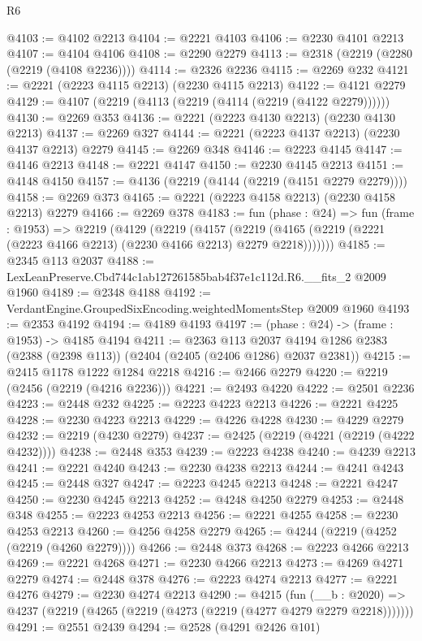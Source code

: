 \begin{lexlean}{R6}
\begin{coremodule}
@4103 := @4102 @2213
@4104 := @2221 @4103
@4106 := @2230 @4101 @2213
@4107 := @4104 @4106
@4108 := @2290 @2279
@4113 := @2318 (@2219 (@2280 (@2219 (@4108 @2236))))
@4114 := @2326 @2236
@4115 := @2269 @232
@4121 := @2221 (@2223 @4115 @2213) (@2230 @4115 @2213)
@4122 := @4121 @2279
@4129 := @4107 (@2219 (@4113 (@2219 (@4114 (@2219 (@4122 @2279))))))
@4130 := @2269 @353
@4136 := @2221 (@2223 @4130 @2213) (@2230 @4130 @2213)
@4137 := @2269 @327
@4144 := @2221 (@2223 @4137 @2213) (@2230 @4137 @2213) @2279
@4145 := @2269 @348
@4146 := @2223 @4145
@4147 := @4146 @2213
@4148 := @2221 @4147
@4150 := @2230 @4145 @2213
@4151 := @4148 @4150
@4157 := @4136 (@2219 (@4144 (@2219 (@4151 @2279 @2279))))
@4158 := @2269 @373
@4165 := @2221 (@2223 @4158 @2213) (@2230 @4158 @2213) @2279
@4166 := @2269 @378
@4183 := fun (phase : @24) =>
  fun (frame : @1953) =>
  @2219
    (@4129
      (@2219
        (@4157
          (@2219 (@4165 (@2219 (@2221 (@2223 @4166 @2213) (@2230 @4166 @2213) @2279 @2218)))))))
@4185 := @2345 @113 @2037
@4188 := LexLeanPreserve.Cbd744c1ab127261585bab4f37e1c112d.R6.__fits_2 @2009 @1960
@4189 := @2348 @4188
@4192 := VerdantEngine.GroupedSixEncoding.weightedMomentsStep @2009 @1960
@4193 := @2353 @4192
@4194 := @4189 @4193
@4197 := (phase : @24) -> (frame : @1953) -> @4185 @4194
@4211 := @2363
    @113
    @2037
    @4194
    @1286
    @2383
    (@2388 (@2398 @113))
    (@2404 (@2405 (@2406 @1286) @2037 @2381))
@4215 := @2415 @1178 @1222 @1284 @2218
@4216 := @2466 @2279
@4220 := @2219 (@2456 (@2219 (@4216 @2236)))
@4221 := @2493 @4220
@4222 := @2501 @2236
@4223 := @2448 @232
@4225 := @2223 @4223 @2213
@4226 := @2221 @4225
@4228 := @2230 @4223 @2213
@4229 := @4226 @4228
@4230 := @4229 @2279
@4232 := @2219 (@4230 @2279)
@4237 := @2425 (@2219 (@4221 (@2219 (@4222 @4232))))
@4238 := @2448 @353
@4239 := @2223 @4238
@4240 := @4239 @2213
@4241 := @2221 @4240
@4243 := @2230 @4238 @2213
@4244 := @4241 @4243
@4245 := @2448 @327
@4247 := @2223 @4245 @2213
@4248 := @2221 @4247
@4250 := @2230 @4245 @2213
@4252 := @4248 @4250 @2279
@4253 := @2448 @348
@4255 := @2223 @4253 @2213
@4256 := @2221 @4255
@4258 := @2230 @4253 @2213
@4260 := @4256 @4258 @2279
@4265 := @4244 (@2219 (@4252 (@2219 (@4260 @2279))))
@4266 := @2448 @373
@4268 := @2223 @4266 @2213
@4269 := @2221 @4268
@4271 := @2230 @4266 @2213
@4273 := @4269 @4271 @2279
@4274 := @2448 @378
@4276 := @2223 @4274 @2213
@4277 := @2221 @4276
@4279 := @2230 @4274 @2213
@4290 := @4215
    (fun (__b : @2020) => @4237 (@2219 (@4265 (@2219 (@4273 (@2219 (@4277 @4279 @2279 @2218)))))))
@4291 := @2551 @2439
@4294 := @2528 (@4291 @2426 @101)

\end{coremodule}
\end{lexlean}
